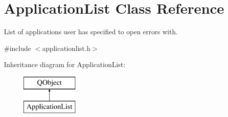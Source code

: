 \hypertarget{class_application_list}{\section{Application\-List Class Reference}
\label{class_application_list}
}


List of applications user has specified to open errors with.  




{\ttfamily \#include $<$applicationlist.\-h$>$}

Inheritance diagram for Application\-List\-:\begin{figure}[H]
\begin{center}
\leavevmode
\includegraphics[height=2.000000cm]{class_application_list}
\end{center}
\end{figure}

